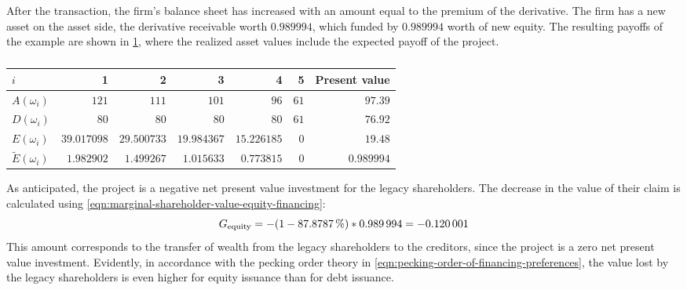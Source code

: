 \documentclass[main.tex]{subfiles}
\begin{document}
        After the transaction, the firm's balance sheet has increased with an amount equal to the premium of the derivative. 
        The firm has a new asset on the asset side, the derivative receivable worth $\num{0.989994}$, which funded by $\num{0.989994}$ worth of new equity.
        The resulting payoffs of the example are shown in \cref{tbl:equity-funding-payoff},
        where the realized asset values include the expected payoff of the project.
        \begin{table}[H]
            \centering\begin{tabular}{l|rrrrr||r}
                $i$ & 1 & 2 & 3 & 4 & 5 & Present value \\
                \hline
                $A(\omega_{i})$ & $\num{121}$ & $\num{111}$ & $\num{101}$ & $\num{96}$ & $\num{61}$ & $\num{97.39}$ \\
                $D(\omega_{i})$ & $\num{80}$ & $\num{80}$ & $\num{80}$ & $\num{80}$ & $\num{61}$ & $\num{76.92}$ \\
                $E(\omega_{i})$ & $\num{39.017098}$ & $\num{29.500733}$ & $\num{19.984367}$ & $\num{15.226185}$ & $\num{0}$ & $\num{19.48}$ \\
                $\tilde{E}(\omega_{i})$ & $\num{1.982902}$ & $\num{1.499267}$ & $\num{1.015633}$ & $\num{0.773815}$ & $\num{0}$ & $\num{0.989994}$ \\
            \end{tabular}
            \caption{}
            \label{tbl:equity-funding-payoff}
        \end{table}

        As anticipated,
        the project is a negative net present value investment for the legacy shareholders. 
        The decrease in the value of their claim is calculated using
        \cref{eqn:marginal-shareholder-value-equity-financing}:
        \begin{equation*}
                G_{\text{equity}}
            =
                - (\num{1} - \pct{0.878787}) * \num{0.989994}
            = 
                -\num{0.120001}
        \end{equation*}
        This amount corresponds to the transfer of wealth 
        from the legacy shareholders to the creditors,
        since the project is a zero net present value investment.
        Evidently, in accordance with the pecking order theory in 
        \cref{eqn:pecking-order-of-financing-preferences},
        the value lost by the legacy shareholders 
        is even higher for equity issuance than for debt issuance.
\end{document}
